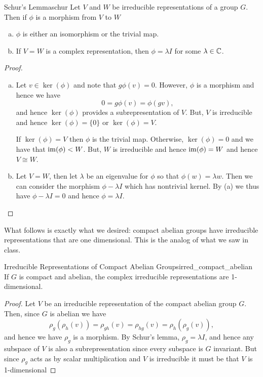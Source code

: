 \begin{thm}{Schur's Lemma}{schur}
    Let $V$ and $W$ be irreducible representations of a group $G$. Then if $\phi$ is a morphism from $V$ to $W$
    \begin{enumerate}[(a)]
        \item $\phi$ is either an isomorphism or the trivial map.
        \item If $V=W$ is a complex representation, then $\phi=\lambda I$ for some $\lambda \in \mathbb{C}$.
    \end{enumerate}
    \tcblower
    \begin{proof}
    \begin{enumerate}[(a)]
        \item Let $v \in \ker(\phi)$ and note that $g\phi(v)=0$.  However, $\phi$ is a morphism and hence we have
        \[
        0=g\phi(v)=\phi(gv),
        \]
        and hence $\ker(\phi)$ provides a subrepresentation of $V$. But, $V$ is irreducible and hence $\ker(\phi)=\{0\}$ or $\ker(\phi)=V$.  
        
        If $\ker(\phi)=V$ then $\phi$ is the trivial map.  Otherwise, $\ker(\phi)=0$ and we have that $\mathrm{im}(\phi)<W$. But, $W$ is irreducible and hence $\mathrm{im}(\phi)=W$ and hence $V\cong W$.
        
        \item Let $V=W$, then let $\lambda$ be an eigenvalue for $\phi$ so that $\phi(w)=\lambda w$.  Then we can consider the morphism $\phi-\lambda I$ which has nontrivial kernel. By (a) we thus have $\phi-\lambda I=0$ and hence $\phi=\lambda I$.
    \end{enumerate}
    \end{proof}
\end{thm}

What follows is exactly what we desired: compact abelian groups have irreducible representations that are one dimensional.  This is the analog of what we saw in class.

\begin{thm}{Irreducible Representations of Compact Abelian Groups}{irred_compact_abelian}
    If $G$ is compact and abelian, the complex irreducible representations are 1-dimensional.
    \tcblower
    \begin{proof}
    Let $V$ be an irreducible representation of the compact abelian group $G$. Then, since $G$ is abelian we have
    \[
    \rho_g(\rho_h(v))=\rho_{gh}(v)=\rho_{hg}(v)=\rho_h(\rho_g(v)),
    \]
    and hence we have $\rho_g$ is a morphism. By Schur's lemma, $\rho_g=\lambda I$, and hence any subspace of $V$ is also a subrepresentation since every subspace is $G$ invariant.  But since $\rho_g$ acts as by scalar multiplication and $V$ is irreducible it must be that $V$ is 1-dimensional 
    \end{proof}
\end{thm}

